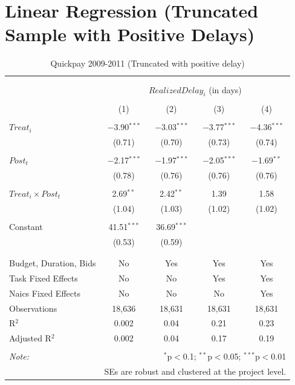 \documentclass[
]{article}
\begin{document}
\hypertarget{linear-regression-truncated-sample-with-positive-delays}{%
\section{Linear Regression (Truncated Sample with Positive
Delays)}\label{linear-regression-truncated-sample-with-positive-delays}}

\begin{table}[H] \centering 
  \caption{Quickpay 2009-2011 (Truncated with positive delay)} 
  \label{} 
\small 
\begin{tabular}{@{\extracolsep{-2pt}}lcccc} 
\\[-1.8ex]\hline 
\hline \\[-1.8ex] 
\\[-1.8ex] & \multicolumn{4}{c}{$RealizedDelay_{i}$ (in days)} \\ 
\\[-1.8ex] & (1) & (2) & (3) & (4)\\ 
\hline \\[-1.8ex] 
 $Treat_i$ & $-$3.90$^{***}$ & $-$3.03$^{***}$ & $-$3.77$^{***}$ & $-$4.36$^{***}$ \\ 
  & (0.71) & (0.70) & (0.73) & (0.74) \\ 
  & & & & \\ 
 $Post_t$ & $-$2.17$^{***}$ & $-$1.97$^{***}$ & $-$2.05$^{***}$ & $-$1.69$^{**}$ \\ 
  & (0.78) & (0.76) & (0.76) & (0.76) \\ 
  & & & & \\ 
 $Treat_i \times Post_t$ & 2.69$^{**}$ & 2.42$^{**}$ & 1.39 & 1.58 \\ 
  & (1.04) & (1.03) & (1.02) & (1.02) \\ 
  & & & & \\ 
 Constant & 41.51$^{***}$ & 36.69$^{***}$ &  &  \\ 
  & (0.53) & (0.59) &  &  \\ 
  & & & & \\ 
\hline \\[-1.8ex] 
Budget, Duration, Bids & No & Yes & Yes & Yes \\ 
Task Fixed Effects & No & No & Yes & Yes \\ 
Naics Fixed Effects & No & No & No & Yes \\ 
Observations & 18,636 & 18,631 & 18,631 & 18,631 \\ 
R$^{2}$ & 0.002 & 0.04 & 0.21 & 0.23 \\ 
Adjusted R$^{2}$ & 0.002 & 0.04 & 0.17 & 0.19 \\ 
\hline 
\hline \\[-1.8ex] 
\textit{Note:}  & \multicolumn{4}{r}{$^{*}$p$<$0.1; $^{**}$p$<$0.05; $^{***}$p$<$0.01} \\ 
 & \multicolumn{4}{r}{SEs are robust and clustered at the project level.} \\ 
\end{tabular} 
\end{table}
\end{document}
